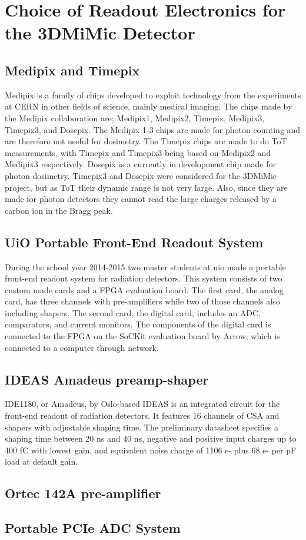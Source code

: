 \documentclass[../main/thesis.tex]{subfiles}
\begin{document}
\newpage

\chapter{Choice of Readout Electronics for the 3DMiMic Detector}
\label{e}

\section{Medipix and Timepix}
\label{e-medipix}
Medipix is a family of chips developed to exploit technology from the experiments at CERN in other fields of science, mainly medical imaging. The chips made by the Medipix collaboration are; Medipix1, Medipix2, Timepix, Medipix3, Timepix3, and Dosepix. The Medipix 1-3 chips are made for photon counting and are therefore not useful for dosimetry. The Timepix chips are made to do \gls{ToT} measurements, with Timepix and Timepix3 being based on Medipix2 and Medipix3 respectively. Dosepix is a currently in development chip made for photon dosimetry. Timepix3 and Dosepix were considered for the 3DMiMic project, but as \gls{ToT} their dynamic range is not very large. Also, since they are made for photon detectors they cannot read the large charges released by a carbon ion in the Bragg peak. 

\section{UiO Portable Front-End Readout System}
\label{e-uio}
During the school year 2014-2015 two master students at \gls{uio} made a portable front-end readout system for radiation detectors. \citep{tali} \citep{oltedal} This system consists of two custom made cards and a \gls{FPGA} evaluation board. The first card, the analog card, has three channels with pre-amplifiers while two of those channels also including shapers. The second card, the digital card, includes an \gls{ADC}, comparators, and current monitors. The components of the digital card is connected to the \gls{FPGA} on the SoCKit evaluation board by Arrow, which is connected to a computer through network. 

\section{IDEAS Amadeus preamp-shaper}
\label{e-ide1180}
IDE1180, or Amadeus, by Oslo-based IDEAS is an integrated circuit for the front-end readout of radiation detectors. It features 16 channels of \gls{CSA} and shapers with adjustable shaping time. The preliminary datasheet \citep{IDE1180} specifies a shaping time between 20 ns and 40 ns, negative and positive input charges up to 400 fC with lowest gain, and equivalent noise charge of 1106 e- plus 68 e- per pF load at default gain. 



\section{Ortec 142A pre-amplifier}
\label{e-ortec}

\section{Portable PCIe ADC System}
\label{e-adc}
\end{document}
